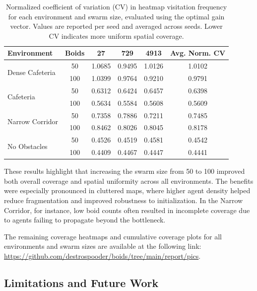 \documentclass[12pt]{article}
\begin{document}
\begin{table}[H]
    \footnotesize
    \centering
    \begin{tabular}{|l|c|c|c|c|c|}
    \hline
    \textbf{Environment} & \textbf{Boids} & \textbf{27} & \textbf{729} & \textbf{4913} & \textbf{Avg. Norm. CV} \\
    \hline
    \multirow{2}{*}{Dense Cafeteria}    
        & 50  & 1.0685 & 0.9495 & 1.0126 & 1.0102 \\
        & 100 & 1.0399 & 0.9764 & 0.9210 & 0.9791 \\
    \hline
    \multirow{2}{*}{Cafeteria}          
        & 50  & 0.6312 & 0.6424 & 0.6457 & 0.6398 \\
        & 100 & 0.5634 & 0.5584 & 0.5608 & 0.5609 \\
    \hline
    \multirow{2}{*}{Narrow Corridor}    
        & 50  & 0.7358 & 0.7886 & 0.7211 & 0.7485 \\
        & 100 & 0.8462 & 0.8026 & 0.8045 & 0.8178 \\
    \hline
    \multirow{2}{*}{No Obstacles}       
        & 50  & 0.4526 & 0.4519 & 0.4581 & 0.4542 \\
        & 100 & 0.4409 & 0.4467 & 0.4447 & 0.4441 \\
    \hline
    \end{tabular}
    \caption{Normalized coefficient of variation (CV) in heatmap visitation frequency for each environment and swarm size, evaluated using the optimal gain vector. Values are reported per seed and averaged across seeds. Lower CV indicates more uniform spatial coverage.}
    \label{tab:normalized_cv}
\end{table}

These results highlight that increasing the swarm size from 50 to 100 improved both overall coverage and spatial uniformity across all environments. The benefits were especially pronounced in cluttered maps, where higher agent density helped reduce fragmentation and improved robustness to initialization. In the Narrow Corridor, for instance, low boid counts often resulted in incomplete coverage due to agents failing to propagate beyond the bottleneck.

The remaining coverage heatmaps and cumulative coverage plots for all environments and swarm sizes are available at the following link:
\url{https://github.com/destrospooder/boids/tree/main/report/pics}.

\subsection{Limitations and Future Work}
\end{document}
